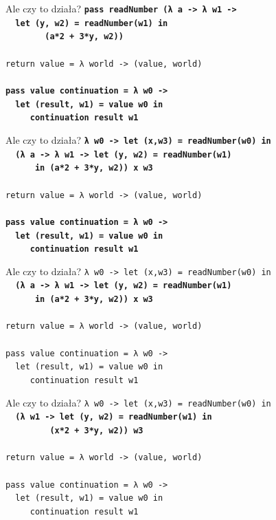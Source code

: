 \documentclass{beamer}
\begin{document}
\begin{frame}{Ale czy to działa?}
  \texttt{\textbf{pass readNumber (λ a -> λ w1 ->\\
      \ \ let (y, w2) = readNumber(w1) in\\
      \ \ \ \ \ \ \ \ (a*2 + 3*y, w2))}\\
    \ \\
    return value = λ world -> (value, world) \\
    \ \\
    \textbf{pass value continuation = λ w0 -> \\
      \ \ let (result, w1) = value w0 in \\
      \ \ \ \ \ continuation result w1}
  }
\end{frame}

\begin{frame}{Ale czy to działa?}
  \texttt{\textbf{λ w0 -> let (x,w3) = readNumber(w0) in\\
      \ \ (λ a -> λ w1 -> let (y, w2) = readNumber(w1) \\
      \ \ \ \ \ \ in (a*2 + 3*y, w2)) x w3}\\
    \ \\
    return value = λ world -> (value, world) \\
    \ \\
    \textbf{pass value continuation = λ w0 -> \\
      \ \ let (result, w1) = value w0 in \\
      \ \ \ \ \ continuation result w1}
  }
\end{frame}

\begin{frame}{Ale czy to działa?}
  \texttt{λ w0 -> let (x,w3) = readNumber(w0) in\\
    \ \ \textbf{(λ a -> λ w1 -> let (y, w2) = readNumber(w1)\\
      \ \ \ \ \ \ in (a*2 + 3*y, w2)) x w3}\\
    \ \\
    return value = λ world -> (value, world) \\
    \ \\
    pass value continuation = λ w0 -> \\
    \ \ let (result, w1) = value w0 in \\
    \ \ \ \ \ continuation result w1
  }
\end{frame}

\begin{frame}{Ale czy to działa?}
  \texttt{λ w0 -> let (x,w3) = readNumber(w0) in\\
    \ \ \textbf{(λ w1 -> let (y, w2) = readNumber(w1) in\\
      \ \ \ \ \ \ \ \ \ (x*2 + 3*y, w2)) w3}\\
    \ \\
    return value = λ world -> (value, world) \\
    \ \\
    pass value continuation = λ w0 -> \\
    \ \ let (result, w1) = value w0 in \\
    \ \ \ \ \ continuation result w1
  }
\end{frame}
\end{document}
